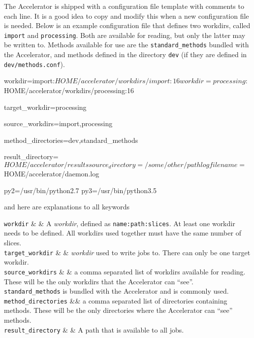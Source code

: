 The Accelerator is shipped with a configuration file template with
comments to each line.  It is a good idea to copy and modify this when
a new configuration file is needed.  Below is an example configuration
file that defines two workdirs, called \texttt{import} and
\texttt{processing}.  Both are available for reading, but only the
latter may be written to.  Methods available for use are the
\texttt{standard\_methods} bundled with the Accelerator, and methods
defined in the directory \texttt{dev} (if they are defined in
\texttt{dev/methods.conf}).
\begin{leftbar}
\begin{shell}
workdir=import:${HOME}/accelerator/workdirs/import:16
workdir=processing:${HOME}/accelerator/workdirs/processing:16

target_workdir=processing

source_workdirs=import,processing

method_directories=dev,standard_methods

result_directory=${HOME}/accelerator/results

source_directory=/some/other/path

logfilename=${HOME}/accelerator/daemon.log

py2=/usr/bin/python2.7
py3=/usr/bin/python3.5
\end{shell}
\end{leftbar}
\noindent and here are explanations to all keywords
\starttable

\RP \texttt{workdir} & & A \textsl{workdir}, defined as
\texttt{name:path:slices}.  At least one workdir needs to be defined.
All workdirs used together must have the same number of slices.\\

\RP \texttt{target\_workdir} & & \textsl{workdir} used to
write jobs to.  There can only be one target workdir.\\

\RP \texttt{source\_workdirs} & & a comma separated list of workdirs
available for reading.  These will be the only workdirs that the
Accelerator can ``see''.  \texttt{standard\_methods} is bundled with
the Accelerator and is commonly used.\\

\RP \texttt{method\_directories} && a comma separated list of
directories containing methods.  These will be the only directories
where the Accelerator can ``see'' methods.\\

\RP \texttt{result\_directory} & & A path that is available to all
jobs.    \\

